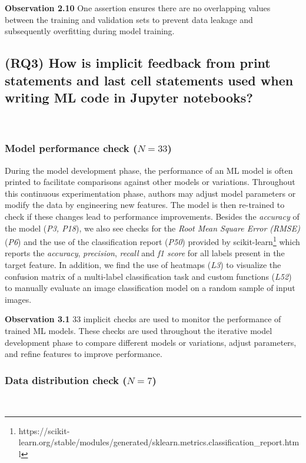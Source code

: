 \documentclass[journal]{IEEEtran}       %
\newcommand{\highlight}[1]{
  \begin{framed}%
    \noindent#1
\end{framed}}
\begin{document}
\highlight{\textbf{Observation 2.10} One assertion ensures there are
  no overlapping values between the training and validation sets to
prevent data leakage and subsequently overfitting during model training.}

\subsection{(RQ3) How is implicit feedback from print statements and
  last cell statements used when writing ML code in Jupyter
notebooks?}~\label{sec:result-implicit}

\subsubsection{Model performance check ($N = 33$)}

During the model development phase, the performance of an ML model is
often printed to facilitate comparisons against other models or
variations. Throughout this continuous experimentation phase, authors
may adjust model parameters or modify the data by engineering new
features. The model is then re-trained to check if these changes lead
to performance improvements. Besides the \emph{accuracy} of the model
(\emph{P3, P18}), we also see checks for the \emph{Root Mean Square
Error (RMSE)} (\emph{P6}) and the use of the classification report
(\emph{P50}) provided by
scikit-learn\footnote{https://scikit-learn.org/stable/modules/generated/sklearn.metrics.classification\_report.html}
which reports the \emph{accuracy}, \emph{precision}, \emph{recall}
and \emph{f1 score} for all labels present in the target feature. In
addition, we find the use of heatmaps (\emph{L3}) to visualize the
confusion matrix of a multi-label classification task and custom
functions (\emph{L52}) to manually evaluate an image classification
model on a random sample of input images.

\highlight{\textbf{Observation 3.1} 33 implicit checks are used to
  monitor the performance of trained ML models. These checks are used
  throughout the iterative model development phase to compare different
  models or variations, adjust parameters, and refine features to
improve performance.}

\subsubsection{Data distribution check ($N =
7$)}~\label{sec:data-distribution-output}
\end{document}
